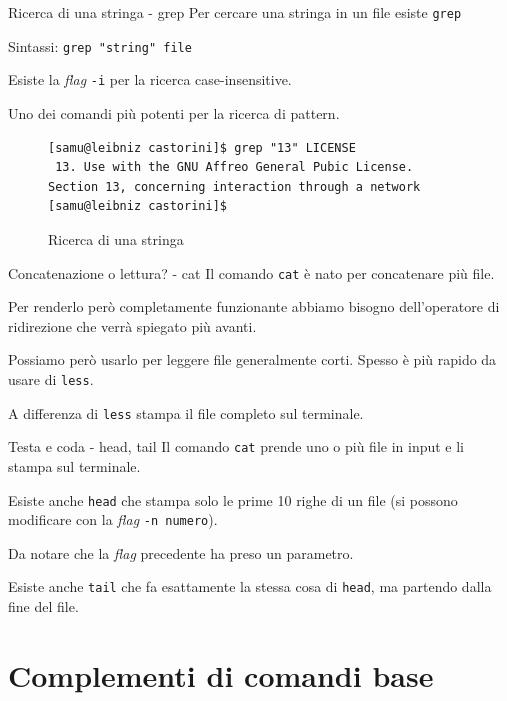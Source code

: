 \documentclass{beamer}
\begin{document}
\begin{frame}[fragile]{Ricerca di una stringa - grep}
  Per cercare una stringa in un file esiste \texttt{grep}\bigskip

  Sintassi: \texttt{grep "string" file}\bigskip

  Esiste la \textit{flag} \texttt{-i} per la ricerca case-insensitive.\bigskip

  Uno dei comandi più potenti per la ricerca di pattern.
  \begin{figure}
    \begin{lstlisting}[basicstyle=\footnotesize]
[samu@leibniz castorini]$ grep "13" LICENSE
 13. Use with the GNU Affreo General Pubic License.
Section 13, concerning interaction through a network
[samu@leibniz castorini]$
    \end{lstlisting}
    \caption{Ricerca di una stringa}
  \end{figure}
\end{frame}

\begin{frame}{Concatenazione o lettura? - cat}
  Il comando \texttt{cat} è nato per concatenare più file.\bigskip

  Per renderlo però completamente funzionante abbiamo bisogno dell'operatore
  di ridirezione che verrà spiegato più avanti.\bigskip

  Possiamo però usarlo per leggere file generalmente corti. Spesso è più rapido
  da usare di \texttt{less}.\bigskip

  A differenza di \texttt{less} stampa il file completo sul terminale.
\end{frame}

\begin{frame}{Testa e coda - head, tail}
  Il comando \texttt{cat} prende uno o più file in input e li stampa sul 
  terminale.\bigskip

  Esiste anche \texttt{head} che stampa solo le prime 10 righe di un file (si
  possono modificare con la \textit{flag} \texttt{-n numero}).\medskip

  Da notare che la \textit{flag} precedente ha preso un parametro.\bigskip

  Esiste anche \texttt{tail} che fa esattamente la stessa cosa di \texttt{head}, 
  ma partendo dalla fine del file.
\end{frame}

\section{Complementi di comandi base}
\end{document}
